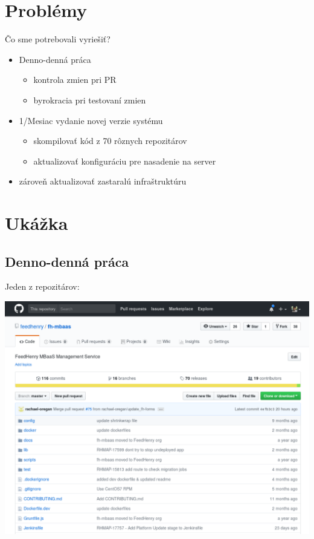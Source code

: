 \documentclass[bigger]{beamer}
\begin{document}
\section{Problémy}
\label{sec:org1328a95}
\begin{frame}[label={sec:orgcbf3199}]{Čo sme potrebovali vyriešiť?}
\begin{itemize}
\item Denno-denná práca
\begin{itemize}
\item kontrola zmien pri PR
\item byrokracia pri testovaní zmien
\end{itemize}
\item 1/Mesiac vydanie novej verzie systému
\begin{itemize}
\item skompilovať kód z 70 rôznych repozitárov
\item aktualizovať konfiguráciu pre nasadenie na server
\end{itemize}
\item zároveň aktualizovať zastaralú infraštruktúru
\end{itemize}
\end{frame}

\section{Ukážka}
\label{sec:org0ededa0}
\subsection{Denno-denná práca}
\label{sec:org451f7ed}
\begin{frame}[label={sec:org13e92da}]{Jeden z repozitárov:}
\begin{center}
\includegraphics[width=.9\linewidth]{./000fhmbaas.png}
\end{center}
\end{frame}
\end{document}

